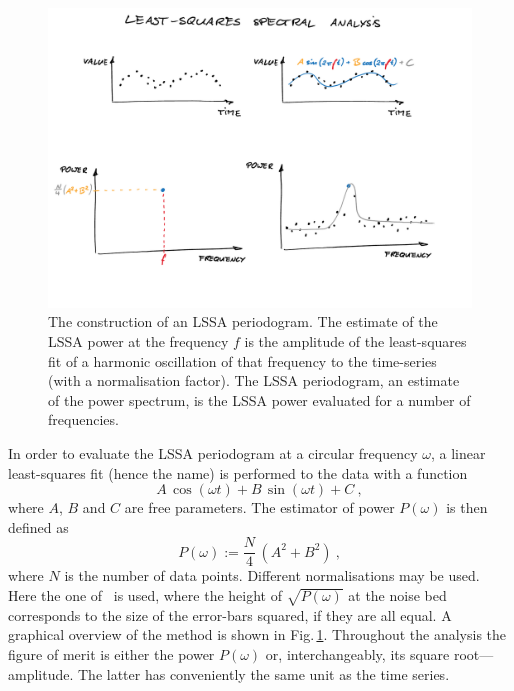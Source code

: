 \begin{figure}
  \centering \includegraphics[width=\linewidth]{gfx/axions/LSSA}
  \caption{The construction of an LSSA periodogram.
  The estimate of the LSSA power at the frequency $f$ is the amplitude of the least-squares fit of a harmonic oscillation of that frequency to the time-series (with a normalisation factor).
  The LSSA periodogram, an estimate of the power spectrum, is the LSSA power evaluated for a number of frequencies.}\label{fig:LSSA_overview}
\end{figure}

In order to evaluate the LSSA periodogram at a circular frequency $\omega$, a linear least-squares fit (hence the name) is performed to the data with a function
\begin{equation}
  A\,\cos(\omega t) + B\,\sin(\omega t) + C \ ,
\end{equation}
where $A$, $B$ and $C$ are free parameters. The estimator of power $P(\omega)$ is then defined as
\begin{equation}
  P(\omega) := \frac{N}{4} \, \left( A^2 + B^2 \right) \ ,
\end{equation}
where $N$ is the number of data points. Different normalisations may be used.
Here the one of~\cite{Scargle1982} is used, where the height of $\sqrt{P(\omega)}$ at the noise bed corresponds to the size of the error-bars squared, if they are all equal. A graphical overview of the method is shown in Fig.\,\ref{fig:LSSA_overview}. Throughout the analysis the figure of merit is either the power $P(\omega)$ or, interchangeably, its square root---amplitude. The latter has conveniently the same unit as the time series.

